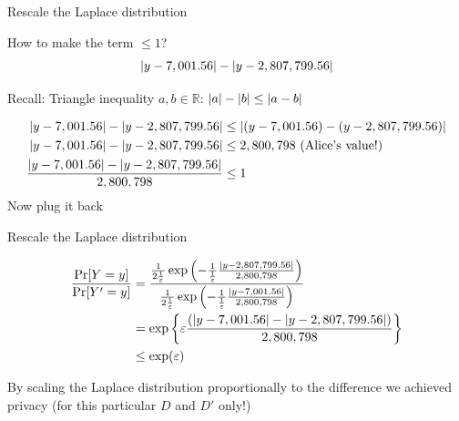 \documentclass[12pt,aspectratio=169,handout]{beamer}
\begin{document}
\begin{frame}{Rescale the Laplace distribution}

How to make the term $\leq 1$?
$$
\abs{y - 7,001.56} - \abs{y - 2,807,799.56}
$$

\begin{block}{Recall: Triangle inequality}
$a, b \in \mathbb{R}$:
$\abs{a} - \abs{b} \leq \abs{a- b}$
\end{block}
$$
\begin{aligned}
\abs{y - 7,001.56} - \abs{y - 2,807,799.56} &\leq \abs{(y - 7,001.56) - (y - 2,807,799.56)} \\
\abs{y - 7,001.56} - \abs{y - 2,807,799.56} &\leq 2,800,798 \text{ (Alice's value!)} \\
\frac{
\abs{y - 7,001.56} - \abs{y - 2,807,799.56}
}{2,800,798} &\leq 1 \\
\end{aligned}
$$
Now plug it back

\end{frame}



\begin{frame}{Rescale the Laplace distribution}


$$
\begin{aligned}
\frac{\Pr[Y = y]}{\Pr[Y' = y]} &=
\frac{
\frac{1}{2\frac{1}{\varepsilon}} \exp \left(- \frac{1}{\frac{1}{\varepsilon}}
\frac{
\abs{y - 2,807,799.56}
}{2,800,798}
\right)
}{
\frac{1}{2\frac{1}{\varepsilon}} \exp \left(- \frac{1}{\frac{1}{\varepsilon}}
\frac{
\abs{y - 7,001.56}
}{2,800,798}
\right) 
} \\
&=
\exp \left\{ \varepsilon
\frac{
\left( \abs{y - 7,001.56} - \abs{y - 2,807,799.56} \right)
}{2,800,798}
\right\} \\
& \leq \exp(\varepsilon) \\
\end{aligned}
$$

By scaling the Laplace distribution proportionally to the difference we achieved privacy (for this particular $D$ and $D'$ only!)
\end{frame}
\end{document}

